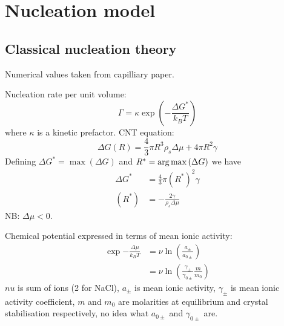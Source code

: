 \documentclass[11pt,twoside]{report}
\begin{document}

\section{Nucleation model}
\subsection{Classical nucleation theory}

Numerical values taken from capilliary paper.

Nucleation rate per unit volume:
\begin{equation}
  \Gamma = \kappa \exp{\left(-\frac{\Delta G^{*}}{k_B T}\right)}
\end{equation}
where $\kappa$ is a kinetic prefactor.
CNT equation:
\begin{equation}
  \Delta G(R) = \frac{4}{3} \pi R^3 \rho_s \Delta \mu + 4\pi R^2 \gamma
\end{equation}
Defining $\Delta G^{*} = \max{(\Delta G)}$ and $R^{*} = \operatorname*{arg\,max}{(\Delta G)}$ we have
\begin{align}
  \Delta G^{*} &= \frac{4}{3} \pi (R^{*})^2 \gamma \\
  (R^{*}) &= -\frac{2\gamma}{\rho_s \Delta\mu}
\end{align}
NB: $\Delta \mu < 0$.

Chemical potential expressed in terms of mean ionic activity:
\begin{equation}
  \begin{aligned}
  \exp{-\frac{\Delta \mu}{k_B T}} &=
  \nu \ln{\left( \frac{a_\pm}{a_{0\pm}} \right)} \\
  &=
  \nu \ln{\left( \frac{\gamma_\pm}{\gamma_{0\pm}} \frac{m}{m_0} \right)}
  \end{aligned}
\end{equation}
$nu$ is sum of ions (2 for NaCl), $a_\pm$ is mean ionic activity, $\gamma_\pm$ is mean ionic activity coefficient, $m$ and $m_0$ are molarities at equilibrium and crystal stabilisation respectively, no idea what $a_{0\pm}$ and $\gamma_{0\pm}$ are.
\end{document}
